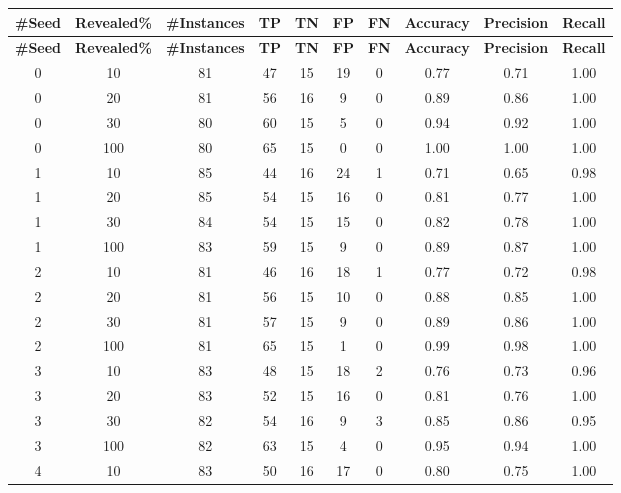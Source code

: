   \begin{longtable}{ |c|c|c|c|c|c|c|c|c|c| }
    \textbf{\#Seed} & \textbf{Revealed\%} & \textbf{\#Instances} & \textbf{TP} & \textbf{TN} & \textbf{FP} & \textbf{FN} & \textbf{Accuracy} & \textbf{Precision} & \textbf{Recall} \\ [0.5ex]
    \hline
    \endfirsthead %
    \hline
    \textbf{\#Seed} & \textbf{Revealed\%} & \textbf{\#Instances} & \textbf{TP} & \textbf{TN} & \textbf{FP} & \textbf{FN} & \textbf{Accuracy} & \textbf{Precision} & \textbf{Recall} \\ [0.5ex]
    \hline
    \endhead
            0 & 10 & 81 & 47 & 15 & 19 & 0 & 0.77 & 0.71 & 1.00 \\ \hline
            0 & 20 & 81 & 56 & 16 & 9 & 0 & 0.89 & 0.86 & 1.00 \\ \hline
            0 & 30 & 80 & 60 & 15 & 5 & 0 & 0.94 & 0.92 & 1.00 \\ \hline
            0 & 100 & 80 & 65 & 15 & 0 & 0 & 1.00 & 1.00 & 1.00 \\ \hline
            1 & 10 & 85 & 44 & 16 & 24 & 1 & 0.71 & 0.65 & 0.98 \\ \hline
            1 & 20 & 85 & 54 & 15 & 16 & 0 & 0.81 & 0.77 & 1.00 \\ \hline
            1 & 30 & 84 & 54 & 15 & 15 & 0 & 0.82 & 0.78 & 1.00 \\ \hline
            1 & 100 & 83 & 59 & 15 & 9 & 0 & 0.89 & 0.87 & 1.00 \\ \hline
            2 & 10 & 81 & 46 & 16 & 18 & 1 & 0.77 & 0.72 & 0.98 \\ \hline
            2 & 20 & 81 & 56 & 15 & 10 & 0 & 0.88 & 0.85 & 1.00 \\ \hline
            2 & 30 & 81 & 57 & 15 & 9 & 0 & 0.89 & 0.86 & 1.00 \\ \hline
            2 & 100 & 81 & 65 & 15 & 1 & 0 & 0.99 & 0.98 & 1.00 \\ \hline
            3 & 10 & 83 & 48 & 15 & 18 & 2 & 0.76 & 0.73 & 0.96 \\ \hline
            3 & 20 & 83 & 52 & 15 & 16 & 0 & 0.81 & 0.76 & 1.00 \\ \hline
            3 & 30 & 82 & 54 & 16 & 9 & 3 & 0.85 & 0.86 & 0.95 \\ \hline
            3 & 100 & 82 & 63 & 15 & 4 & 0 & 0.95 & 0.94 & 1.00 \\ \hline
            4 & 10 & 83 & 50 & 16 & 17 & 0 & 0.80 & 0.75 & 1.00 \\ \hline

\end{longtable}

